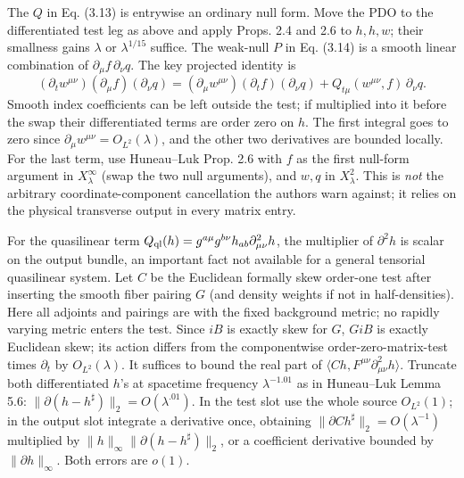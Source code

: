 \documentclass[11pt]{article}
\begin{document}
The \(Q\) in Eq. (3.13) is entrywise an ordinary null form. Move the PDO to the differentiated test leg as above and apply Props. 2.4 and 2.6 to \(h,h,w\); their smallness gains \(\lambda\) or \(\lambda^{1/15}\) suffice. The weak-null \(P\) in Eq. (3.14) is a smooth linear combination of \(\partial_\mu f\,\partial_\nu q\). The key projected identity is
\[
 (\partial_t w^{\mu\nu})(\partial_\mu f)(\partial_\nu q)
 = (\partial_\mu w^{\mu\nu})(\partial_t f)(\partial_\nu q)
   + Q_{t\mu}(w^{\mu\nu},f)\,\partial_\nu q .
\]
Smooth index coefficients can be left outside the test; if multiplied into it before the swap their differentiated terms are order zero on \(h\). The first integral goes to zero since \(\partial_\mu w^{\mu\nu}=O_{L^2}(\lambda)\), and the other two derivatives are bounded locally. For the last term, use Huneau--Luk Prop. 2.6 with \(f\) as the first null-form argument in \(X_\lambda^\infty\) (swap the two null arguments), and \(w,q\) in \(X_\lambda^2\). This is \emph{not} the arbitrary coordinate-component cancellation the authors warn against; it relies on the physical transverse output in every matrix entry.

For the quasilinear term \(Q_{\rm ql}(h)=g^{a\mu}g^{b\nu}h_{ab}\partial_{\mu\nu}^2h\), the multiplier of \(\partial^2 h\) is scalar on the output bundle, an important fact not available for a general tensorial quasilinear system. Let \(C\) be the Euclidean formally skew order-one test after inserting the smooth fiber pairing \(G\) (and density weights if not in half-densities). Here all adjoints and pairings are with the fixed background metric; no rapidly varying metric enters the test. Since \(iB\) is exactly skew for \(G\), \(G iB\) is exactly Euclidean skew; its action differs from the componentwise order-zero-matrix-test times \(\partial_t\) by \(O_{L^2}(\lambda)\). It suffices to bound the real part of \(\langle Ch,F^{\mu\nu}\partial^2_{\mu\nu}h\rangle\). Truncate both differentiated \(h\)'s at spacetime frequency \(\lambda^{-1.01}\) as in Huneau--Luk Lemma 5.6: \(\|\partial(h-h^\sharp)\|_2=O(\lambda^{.01})\). In the test slot use the whole source \(O_{L^2}(1)\); in the output slot integrate a derivative once, obtaining \(\|\partial Ch^\sharp\|_2=O(\lambda^{-1})\) multiplied by \(\|h\|_\infty \|\partial(h-h^\sharp)\|_2\), or a coefficient derivative bounded by \(\|\partial h\|_\infty\). Both errors are \(o(1)\).
\end{document}
